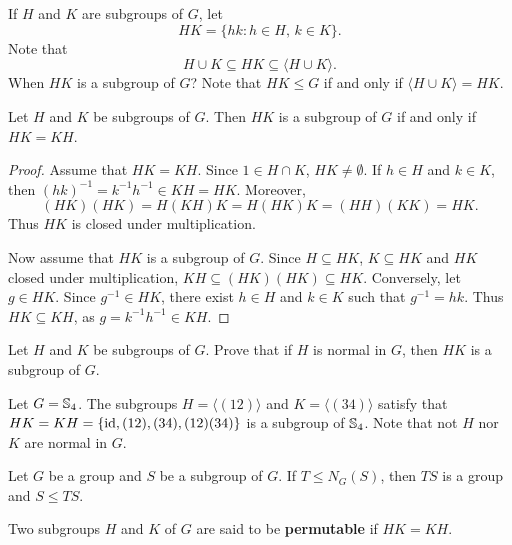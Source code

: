 \chapter{}


If $H$ and $K$ are subgroups of $G$, let 
\[
        HK=\{hk:h\in H,\,k\in K\}.
\]
Note that 
\[
H\cup K\subseteq HK\subseteq\langle H\cup K\rangle.
\]
When $HK$ is a subgroup of $G$? 
Note that $HK\leq G$ if and only if $\langle H\cup K\rangle=HK$.

\begin{proposition}
        Let $H$ and $K$ be subgroups of $G$. Then $HK$ is a subgroup of
        $G$ if and only if $HK=KH$.
\end{proposition}

\begin{proof}
    Assume that $HK=KH$. Since $1\in H\cap K$, $HK\ne\emptyset$. 
    If $h\in H$ and $k\in K$, then $(hk)^{-1}=k^{-1}h^{-1}\in KH=HK$. Moreover, 
    \[
    (HK)(HK)=H(KH)K=H(HK)K=(HH)(KK)=HK.
    \]
    Thus $HK$ is closed under multiplication. 

    Now assume that $HK$ is a subgroup of $G$. Since $H\subseteq HK$,
    $K\subseteq HK$ and $HK$ closed under multiplication,
        $KH\subseteq (HK)(HK)\subseteq HK$. Conversely, let $g\in HK$.
        Since $g^{-1}\in HK$, there exist $h\in H$ and $k\in K$ such that
        $g^{-1}=hk$.
        Thus $HK\subseteq KH$, as 
        $g=k^{-1}h^{-1}\in KH$.
\end{proof}

\begin{exercise}
\label{xca:HK_normal}
Let $H$ and $K$ be subgroups of $G$. Prove that 
if $H$ is normal in $G$, then $HK$ is a subgroup of $G$.
\end{exercise}

\begin{example}
Let $G=\mathbb{S}_4$. The subgroups $H=\langle (12)\rangle$ and $K=\langle (34)\rangle$ satisfy that $HK=KH=\{
\operatorname{id},(12),(34),(12)(34)\}$ is a subgroup of 
$\mathbb{S}_4$. Note that not $H$ nor $K$
are normal in $G$.
\end{example}

\begin{exercise}
Let $G$ be a group and $S$ be a subgroup of $G$. 
If $T\leq N_G(S)$, then $TS$ is a group and $S\leq TS$.
\end{exercise}

Two subgroups $H$ and $K$ of $G$ are said to be
\textbf{permutable} if $HK=KH$.

